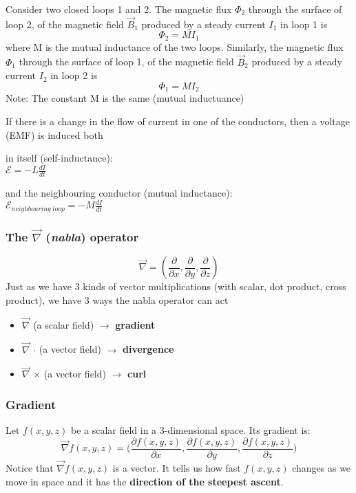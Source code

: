 \documentclass[english,11pt]{article}
\begin{document}
Consider two closed loops 1 and 2.
The magnetic flux $\Phi_2$ through the surface of loop 2, of the magnetic field $\vec{B}_1$ produced by a steady current $I_1$ in loop 1 is
\begin{equation*}
   \Phi_2 = M  I_1
\end{equation*}
where M is the mutual inductance of the two loops.
Similarly,
the magnetic flux $\Phi_1$ through the surface of loop 1, of the magnetic field $\vec{B}_2$ produced by a steady current $I_2$ in loop 2 is
\begin{equation*}
   \Phi_1 = M  I_2
\end{equation*}
Note: The constant M is the same (mutual inductuance)


If there is a change in the flow of current in one of the conductors,
then a voltage (EMF) is induced both
\begin{itemize}
  { \scriptsize
   \item in itself (self-inductance): \\
             $\displaystyle \mathcal{E} = - L \frac{dI}{dt}$
   \item and the neighbouring conductor (mutual inductance):\\
            $\displaystyle \mathcal{E}_{neighbouring\;loop} = - M \frac{dI}{dt}$
  }
\end{itemize}


\subsubsection*{\bf The $\vec\nabla$ ({\em nabla}) operator}
  \begin{equation*}
     \vec{\nabla} = (\frac{\partial}{\partial x}, \frac{\partial}{\partial y}, \frac{\partial}{\partial z})
  \end{equation*}
   Just as we have 3 kinds of vector multiplications (with scalar, dot product, cross product),
   we have 3 ways the nabla operator can act
    \begin{itemize}
       \item $\vec\nabla$ (a scalar field) $\rightarrow$ {\bf gradient}
       \item $\vec\nabla$ $\cdot$ (a vector field) $\rightarrow$ {\bf divergence}
       \item $\vec\nabla$ $\times$ (a vector field) $\rightarrow$ {\bf curl}
    \end{itemize}

\subsubsection*{\bf Gradient}
Let $f(x,y,z)$ be a scalar field in a 3-dimensional space. Its gradient is:
\begin{equation*}
   \vec\nabla f(x,y,z) =
     \Big(
       \frac{\partial f(x,y,z)}{\partial x},
       \frac{\partial f(x,y,z)}{\partial y},
       \frac{\partial f(x,y,z)}{\partial z}
     \Big)
\end{equation*}
Notice that $\vec\nabla f(x,y,z)$ is a vector.
It tells us how fast $f(x,y,z)$ changes as we move in space and it has the {\bf direction of the steepest ascent}.\\
\end{document}
